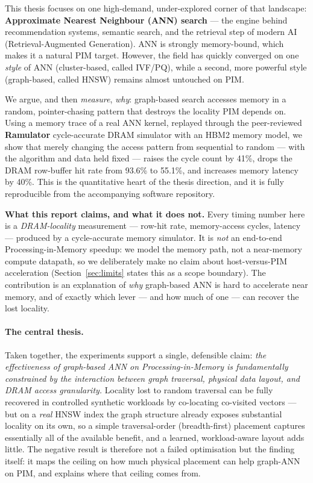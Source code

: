 \documentclass[11pt,a4paper]{article}
\newcommand{\term}[1]{\textbf{\color{slate}#1}}
\begin{document}
This thesis focuses on one high-demand, under-explored corner of that landscape:
\term{Approximate Nearest Neighbour (ANN) search} --- the engine behind recommendation systems,
semantic search, and the retrieval step of modern AI (Retrieval-Augmented Generation). ANN is
strongly memory-bound, which makes it a natural PIM target. However, the field has quickly
converged on one \emph{style} of ANN (cluster-based, called IVF/PQ), while a second, more powerful
style (graph-based, called HNSW) remains almost untouched on PIM.

We argue, and then \emph{measure}, \emph{why}: graph-based search accesses memory in a random,
pointer-chasing pattern that destroys the locality PIM depends on. Using a memory trace of a real
ANN kernel, replayed through the peer-reviewed \term{Ramulator} cycle-accurate DRAM simulator with
an HBM2 memory model, we show that merely changing the access pattern from sequential to random ---
with the algorithm and data held fixed --- raises the cycle count by 41\%, drops the DRAM
row-buffer hit rate from 93.6\% to 55.1\%, and increases memory latency by 40\%. This is the
quantitative heart of the thesis direction, and it is fully reproducible from the accompanying
software repository.

\begin{keybox}
\textbf{What this report claims, and what it does not.} Every timing number here is a
\emph{DRAM-locality} measurement --- row-hit rate, memory-access cycles, latency --- produced by a
cycle-accurate memory simulator. It is \emph{not} an end-to-end Processing-in-Memory speedup: we
model the memory path, not a near-memory compute datapath, so we deliberately make no claim about
host-versus-PIM acceleration (Section~\ref{sec:limits} states this as a scope boundary). The
contribution is an explanation of \emph{why} graph-based ANN is hard to accelerate near memory, and
of exactly which lever --- and how much of one --- can recover the lost locality.
\end{keybox}

\paragraph{The central thesis.} Taken together, the experiments support a single, defensible claim:
\emph{the effectiveness of graph-based ANN on Processing-in-Memory is fundamentally constrained by
the interaction between graph traversal, physical data layout, and DRAM access granularity.}
Locality lost to random traversal can be fully recovered in controlled synthetic workloads by
co-locating co-visited vectors --- but on a \emph{real} HNSW index the graph structure already
exposes substantial locality on its own, so a simple traversal-order (breadth-first) placement
captures essentially all of the available benefit, and a learned, workload-aware layout adds little.
The negative result is therefore not a failed optimisation but the finding itself: it maps the
ceiling on how much physical placement can help graph-ANN on PIM, and explains where that ceiling
comes from.
\end{document}
